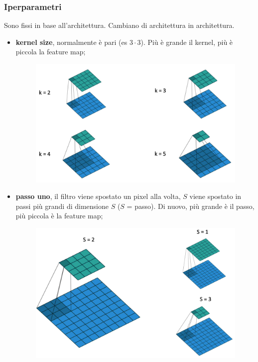 \subsubsection{Iperparametri}
Sono fissi in base all'architettura. Cambiano di architettura in architettura.
\begin{itemize}
    \item \textbf{kernel size}, normalmente è pari (es $3\cdot3$). Più è grande il kernel, più è piccola la feature map;
        \begin{figure}[!h]
            \includegraphics[scale=.25]{images/cnn/kernel_size.png}
            \centering
        \end{figure}
    \item \textbf{passo uno}, il filtro viene spostato un pixel alla volta, $S$ viene spostato in passi più grandi di dimensione $S$ ($S$ = passo). Di nuovo, più grande è il passo, più piccola è la feature map;
        \begin{figure}[!h]
            \includegraphics[scale=.25]{images/cnn/stride.png}

\end{figure}
\end{itemize}
